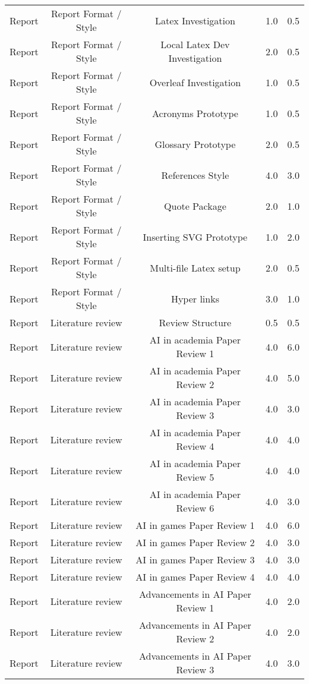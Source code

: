 \begin{longtable}{|c|c|c|c|c|}
	Report & Report Format / Style & Latex Investigation & 1.0 & 0.5 \\
	Report & Report Format / Style & Local Latex Dev Investigation & 2.0 & 0.5 \\
	Report & Report Format / Style & Overleaf Investigation & 1.0 & 0.5 \\
	Report & Report Format / Style & Acronyms Prototype & 1.0 & 0.5 \\
	Report & Report Format / Style & Glossary Prototype & 2.0 & 0.5 \\
	Report & Report Format / Style & References Style & 4.0 & 3.0 \\
	Report & Report Format / Style & Quote Package & 2.0 & 1.0 \\
	Report & Report Format / Style & Inserting SVG Prototype & 1.0 & 2.0 \\
	Report & Report Format / Style & Multi-file  Latex setup & 2.0 & 0.5 \\
	Report & Report Format / Style & Hyper links & 3.0 & 1.0 \\
	Report & Literature review & Review Structure & 0.5 & 0.5 \\
	Report & Literature review & AI in academia Paper Review 1 & 4.0 & 6.0 \\
	Report & Literature review & AI in academia Paper Review 2 & 4.0 & 5.0 \\
	Report & Literature review & AI in academia Paper Review 3 & 4.0 & 3.0 \\
	Report & Literature review & AI in academia Paper Review 4 & 4.0 & 4.0 \\
	Report & Literature review & AI in academia Paper Review 5 & 4.0 & 4.0 \\
	Report & Literature review & AI in academia Paper Review 6 & 4.0 & 3.0 \\
	Report & Literature review & AI in games Paper Review 1 & 4.0 & 6.0 \\
	Report & Literature review & AI in games Paper Review 2 & 4.0 & 3.0 \\
	Report & Literature review & AI in games Paper Review 3 & 4.0 & 3.0 \\
	Report & Literature review & AI in games Paper Review 4 & 4.0 & 4.0 \\
	Report & Literature review & Advancements in AI Paper Review 1 & 4.0 & 2.0 \\
	Report & Literature review & Advancements in AI Paper Review 2 & 4.0 & 2.0 \\
	Report & Literature review & Advancements in AI Paper Review 3 & 4.0 & 3.0 \\

\end{longtable}
